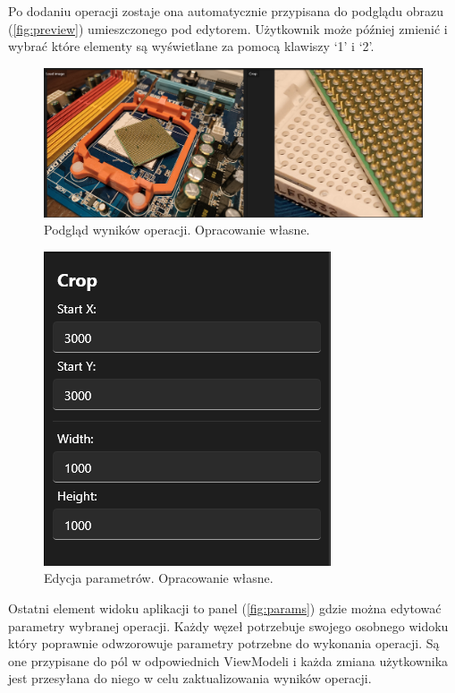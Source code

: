 Po dodaniu operacji zostaje ona automatycznie przypisana do podglądu obrazu (\autoref{fig:preview}) umieszczonego pod edytorem. Użytkownik może później zmienić i wybrać które elementy są wyświetlane za pomocą klawiszy `1' i `2'.

\begin{figure}[H]
    \centering
    \includegraphics[width=1\linewidth]{images/Picture16.png}
    \caption{Podgląd wyników operacji. Opracowanie własne.}
    \label{fig:preview}
\end{figure}

\begin{figure}[H]
    \centering
    \includegraphics[width=0.6\linewidth]{images/Picture17.png}
    \caption{Edycja parametrów. Opracowanie własne.}
    \label{fig:params}
\end{figure}

Ostatni element widoku aplikacji to panel (\autoref{fig:params}) gdzie można edytować parametry wybranej operacji. 
Każdy węzeł potrzebuje swojego osobnego widoku który poprawnie odwzorowuje parametry potrzebne do wykonania operacji. 
Są one przypisane do pól w odpowiednich ViewModeli i każda zmiana użytkownika jest przesyłana do niego w celu zaktualizowania wyników operacji.

